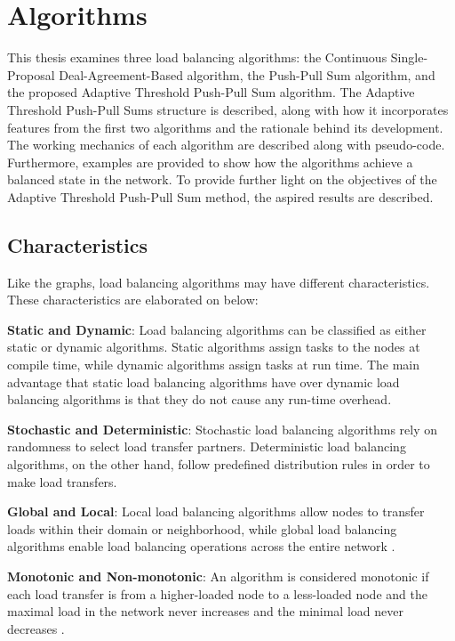 \chapter{Algorithms}\label{chap:algorithms}
This thesis examines three load balancing algorithms: the Continuous Single-Proposal Deal-Agreement-Based algorithm, the Push-Pull Sum algorithm, and the proposed Adaptive Threshold Push-Pull Sum algorithm. The Adaptive Threshold Push-Pull Sums structure is described, along with how it incorporates features from the first two algorithms and the rationale behind its development. The working mechanics of each algorithm are described along with pseudo-code. Furthermore, examples are provided to show how the algorithms achieve a balanced state in the network. To provide further light on the objectives of the Adaptive Threshold Push-Pull Sum method, the aspired results are described.

\section{Characteristics}\label{sec:algoCharacteristics}
Like the graphs, load balancing algorithms may have different characteristics. These characteristics are elaborated on below:

\textbf{Static and Dynamic}: Load balancing algorithms can be classified as either static or dynamic algorithms. Static algorithms assign tasks to the nodes at compile time, while dynamic algorithms assign tasks at run time. The main advantage that static load balancing algorithms have over dynamic load balancing algorithms is that they do not cause any run-time overhead. \cite{Bokhari}

\textbf{Stochastic and Deterministic}: Stochastic load balancing algorithms rely on randomness to select load transfer partners. Deterministic load balancing algorithms, on the other hand, follow predefined distribution rules in order to make load transfers. \cite{ChengzhongFrancis}

\textbf{Global and Local}: Local load balancing algorithms allow nodes to transfer loads within their domain or neighborhood, while global load balancing algorithms enable load balancing operations across the entire network \cite{ChengzhongFrancis}.

\textbf{Monotonic and Non-monotonic}: An algorithm is considered monotonic if each load transfer is from a higher-loaded node to a less-loaded node and the maximal load in the network never increases and the minimal load never decreases \cite{Dinitz2023DAB}.

